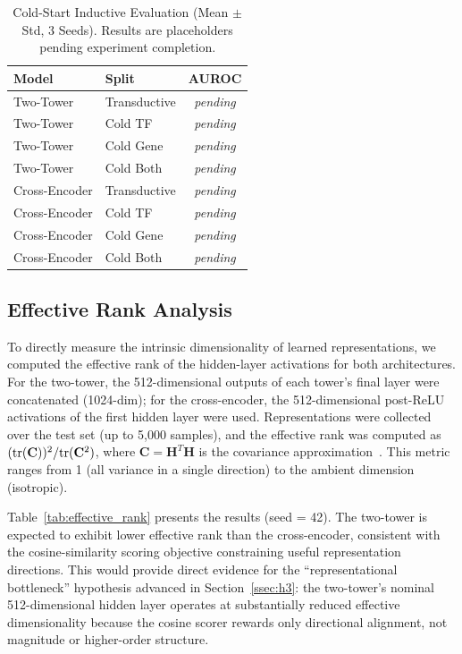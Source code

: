 \documentclass[journal]{IEEEtran}
\begin{document}
\begin{table}[!t]
  \caption{Cold-Start Inductive Evaluation (Mean $\pm$ Std, 3 Seeds).
    Results are placeholders pending experiment completion.}
  \label{tab:inductive}
  \centering
  \footnotesize
  \begin{tabular}{@{}llc@{}}
    \hline
    Model & Split & AUROC \\
    \hline
    Two-Tower     & Transductive & \textit{pending} \\
    Two-Tower     & Cold TF      & \textit{pending} \\
    Two-Tower     & Cold Gene    & \textit{pending} \\
    Two-Tower     & Cold Both    & \textit{pending} \\
    \hline
    Cross-Encoder & Transductive & \textit{pending} \\
    Cross-Encoder & Cold TF      & \textit{pending} \\
    Cross-Encoder & Cold Gene    & \textit{pending} \\
    Cross-Encoder & Cold Both    & \textit{pending} \\
    \hline
  \end{tabular}
\end{table}

\subsection{Effective Rank Analysis}
\label{ssec:effective_rank}

To directly measure the intrinsic dimensionality of learned representations,
we computed the effective rank of the hidden-layer activations for both
architectures. For the two-tower, the 512-dimensional outputs of each tower's
final layer were concatenated (1024-dim); for the cross-encoder, the
512-dimensional post-ReLU activations of the first hidden layer were used.
Representations were collected over the test set (up to 5{,}000 samples),
and the effective rank was computed as $({\rm tr}(\mathbf{C}))^2 /
{\rm tr}(\mathbf{C}^2)$, where $\mathbf{C} = \mathbf{H}^T \mathbf{H}$ is the
covariance approximation~\cite{roy2007}. This metric ranges from 1 (all variance
in a single direction) to the ambient dimension (isotropic).

Table~\ref{tab:effective_rank} presents the results (seed = 42). The two-tower
is expected to exhibit lower effective rank than the cross-encoder, consistent
with the cosine-similarity scoring objective constraining useful representation
directions. This would provide direct evidence for the ``representational
bottleneck'' hypothesis advanced in Section~\ref{ssec:h3}: the two-tower's
nominal 512-dimensional hidden layer operates at substantially reduced effective
dimensionality because the cosine scorer rewards only directional alignment,
not magnitude or higher-order structure.
\end{document}

